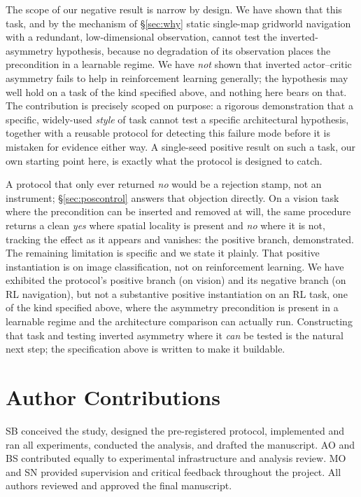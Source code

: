\documentclass[10pt]{article}
\begin{document}
The scope of our negative result is narrow by design. We have shown that this task,
and by the mechanism of \S\ref{sec:why} static single-map gridworld navigation with a
redundant, low-dimensional observation, cannot test the inverted-asymmetry hypothesis,
because no degradation of its observation places the precondition in a learnable regime. We
have \emph{not} shown that inverted actor--critic asymmetry fails to help in reinforcement
learning generally; the hypothesis may well hold on a task of the kind specified above, and
nothing here bears on that. The contribution is precisely scoped on purpose: a rigorous
demonstration that a specific, widely-used \emph{style} of task cannot test a specific
architectural hypothesis, together with a reusable protocol for detecting this failure mode
before it is mistaken for evidence either way. A single-seed positive result on such a task,
our own starting point here, is exactly what the protocol is designed to catch.

A protocol that only ever returned \emph{no} would be a rejection stamp, not an instrument;
\S\ref{sec:poscontrol} answers that objection directly. On a vision task where the
precondition can be inserted and removed at will, the same procedure returns a clean
\emph{yes} where spatial locality is present and \emph{no} where it is not, tracking the
effect as it appears and vanishes: the positive branch, demonstrated. The remaining
limitation is specific and we state it plainly. That positive instantiation is on image
classification, not on reinforcement learning. We have exhibited the protocol's positive
branch (on vision) and its negative branch (on RL navigation), but not a substantive
positive instantiation on an RL task, one of the kind specified above, where the asymmetry
precondition is present in a learnable regime and the architecture comparison can actually
run. Constructing that task and testing inverted asymmetry where it \emph{can} be tested is
the natural next step; the specification above is written to make it buildable.

\ifdefined\ispreprint
\section*{Author Contributions}

SB conceived the study, designed the pre-registered protocol, implemented and ran all
experiments, conducted the analysis, and drafted the manuscript. AO and BS contributed
equally to experimental infrastructure and analysis review. MO and SN provided supervision
and critical feedback throughout the project. All authors reviewed and approved the final
manuscript.
\end{document}
